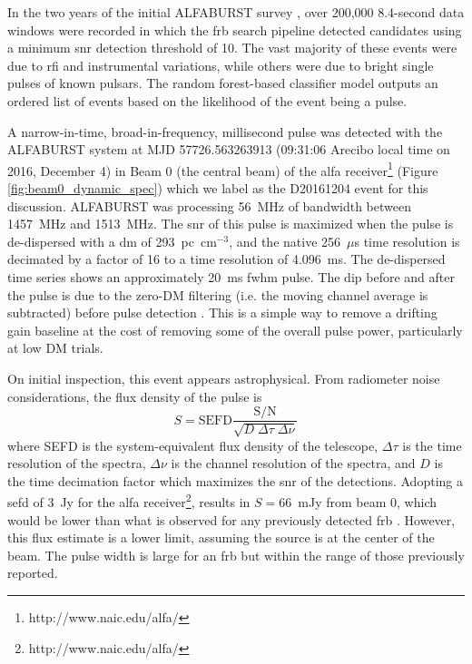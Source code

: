 \documentclass[a4paper,fleqn,usenatbib]{mnras}
\begin{document}
In the two years of the initial ALFABURST survey \citep{2017ApJS..228...21C,
2018MNRAS.474.3847F}, over 200,000 8.4-second data windows were recorded in which
the \gls{frb} search pipeline detected candidates using a minimum \gls{snr}
detection threshold of 10. The vast majority of these events were due to
\gls{rfi} and instrumental variations, while others were due to bright single
pulses of known pulsars.  The random forest-based classifier model outputs an
ordered list of events based on the likelihood of the event being a pulse.

A narrow-in-time, broad-in-frequency, millisecond pulse was detected with the
ALFABURST system at MJD 57726.563263913 (09:31:06 Arecibo local time on 2016,
December 4) in Beam 0 (the central beam) of the \gls{alfa}
receiver\footnote{http://www.naic.edu/alfa/} (Figure
\ref{fig:beam0_dynamic_spec}) which we label as the D20161204 event for this
discussion. ALFABURST was processing 56~MHz of bandwidth between 1457~MHz and
1513~MHz. The \gls{snr} of this pulse is maximized when the pulse is
de-dispersed with a \gls{dm} of 293~pc~cm$^{-3}$, and the native 256~$\mu$s time
resolution is decimated by a factor of 16 to a time resolution of 4.096~ms. The
de-dispersed time series shows an approximately 20~ms \gls{fwhm} pulse.  The dip
before and after the pulse is due to the zero-DM filtering (i.e. the moving
channel average is subtracted) before pulse detection
\citep{2009MNRAS.395..410E}. This is a simple way to remove a drifting gain
baseline at the cost of removing some of the overall pulse power, particularly
at low DM trials.

On initial inspection, this event appears astrophysical. From radiometer noise
considerations, the flux density of the pulse is
%
$$
S = \textrm{SEFD} \frac{\textrm{S/N}}{\sqrt{D \; \Delta \tau \;
\Delta \nu}}
$$
%
where SEFD is the system-equivalent flux density of the telescope, $\Delta \tau$
is the time resolution of the spectra, $\Delta \nu$ is the channel resolution of
the spectra, and $D$ is the time decimation factor which maximizes the \gls{snr}
of the detections.  Adopting a \gls{sefd} of 3~Jy for the \gls{alfa}
receiver\footnote{http://www.naic.edu/alfa/},  results in \mbox{$S = 66$}~mJy
from beam 0, which would be lower than what is observed for any previously
detected \gls{frb} \citep{2016PASA...33...45P}.  However, this flux estimate is
a lower limit, assuming the source is at the center of the beam. The pulse width
is large for an \gls{frb} but within the range of those previously reported.
\end{document}
